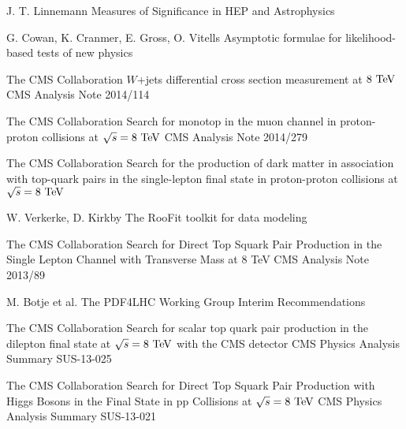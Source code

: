 \begin{thebibliography}{2}
             {J. T. Linnemann}
             {Measures of Significance in HEP and Astrophysics}
             {}

             {G. Cowan, K. Cranmer, E. Gross, O. Vitells}
             {Asymptotic formulae for likelihood-based tests of new physics}
             {}


             {The CMS Collaboration}
             {$W$+jets differential cross section measurement at $8~\text{TeV}$}
             {CMS Analysis Note 2014/114}

             {The CMS Collaboration}
             {Search for monotop in the muon channel in proton-proton collisions at $\sqrt{s} = 8~\text{TeV}$}
             {CMS Analysis Note 2014/279}

             {The CMS Collaboration}
             {Search for the production of dark matter in association with top-quark pairs
             in the single-lepton final state in proton-proton collisions at $\sqrt{s} = 8~\text{TeV}$}
             {}

             {W. Verkerke, D. Kirkby}
             {The RooFit toolkit for data modeling}
             {}


             {The CMS Collaboration}
             {Search for Direct Top Squark Pair Production in the Single Lepton Channel
             with Transverse Mass at 8 TeV}
             {CMS Analysis Note 2013/89}

             {M. Botje et al.}
             {The PDF4LHC Working Group Interim Recommendations}
             {}


             {The CMS Collaboration}
             {Search for scalar top quark pair production in the dilepton
             final state at $\sqrt{s} = 8~\text{TeV}$ with the CMS detector}
             {CMS Physics Analysis Summary SUS-13-025}

             {The CMS Collaboration}
             {Search for Direct Top Squark Pair Production with Higgs Bosons in the Final
             State in pp Collisions at $\sqrt{s} = 8~\text{TeV}$}
             {CMS Physics Analysis Summary SUS-13-021}


\end{thebibliography}

